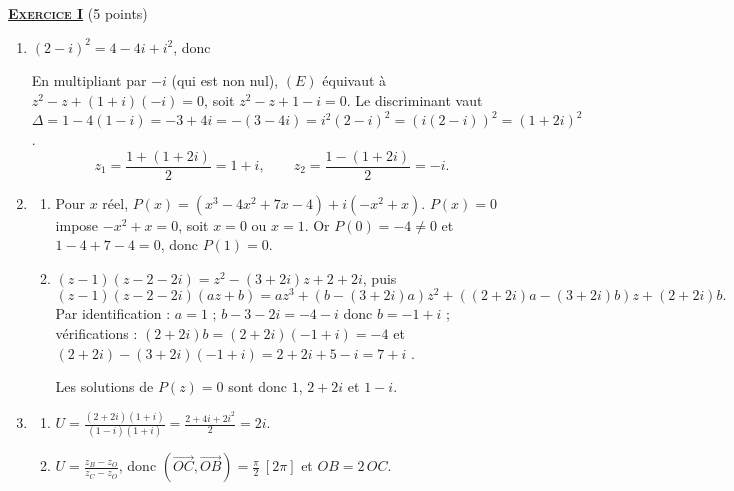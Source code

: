 \providecommand{\Courbe}{(\mathscr{C})}
\providecommand{\cm}{~\mathrm{cm}}
\providecommand{\dx}{~\mathrm{d}x}
%
\noindent \underline{\textsc{\textbf{Exercice I}}} (5 points)
	\begin{enumerate}
		\item {}
			$(2-i)^2 = 4 - 4i + i^2$, donc 

			En multipliant par $-i$ (qui est non nul), $(E)$ équivaut à $z^2 - z + (1+i)(-i) = 0$,
			soit $z^2 - z + 1 - i = 0$.
			Le discriminant vaut $\Delta = 1 - 4(1-i) = -3 + 4i = -(3-4i) = i^2(2-i)^2 = \left(i(2-i)\right)^2 = (1+2i)^2$.
			\[
				z_1 = \frac{1 + (1+2i)}{2} = 1 + i, \qquad z_2 = \frac{1 - (1+2i)}{2} = -i.
			\]

		\item \begin{enumerate}
			\item {}
				Pour $x$ réel, $P(x) = \left(x^3 - 4x^2 + 7x - 4\right) + i\left(-x^2 + x\right)$.
				$P(x) = 0$ impose $-x^2 + x = 0$, soit $x = 0$ ou $x = 1$.
				Or $P(0) = -4 \neq 0$ et $1 - 4 + 7 - 4 = 0$, donc $P(1) = 0$.

			\item {}
				$(z-1)(z-2-2i) = z^2 - (3+2i)z + 2 + 2i$, puis
				\[
					(z-1)(z-2-2i)(az+b) = az^3 + \left(b - (3+2i)a\right)z^2 + \left((2+2i)a - (3+2i)b\right)z + (2+2i)b.
				\]
				Par identification : $a = 1$ ; $b - 3 - 2i = -4 - i$ donc $b = -1 + i$ ;
				vérifications : $(2+2i)b = (2+2i)(-1+i) = -4$ \checkmark{} et
				$(2+2i) - (3+2i)(-1+i) = 2 + 2i + 5 - i = 7 + i$ \checkmark.

				Les solutions de $P(z) = 0$ sont donc $1$, $2+2i$ et $1-i$.
		\end{enumerate}
		\item \begin{enumerate}
			\item {}
				$U = \frac{(2+2i)(1+i)}{(1-i)(1+i)} = \frac{2 + 4i + 2i^2}{2} = 2i$.

			\item {}
				$U = \frac{z_B - z_O}{z_C - z_O}$, donc $\left(\overrightarrow{OC},\overrightarrow{OB}\right) = \frac{\pi}{2}~[2\pi]$
				et $OB = 2\,OC$.


\end{enumerate}
\end{enumerate}
